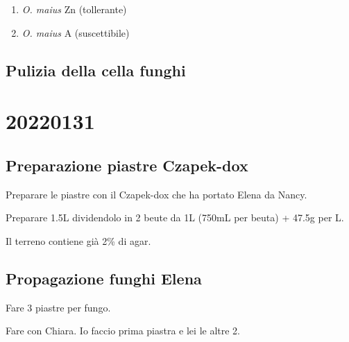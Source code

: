 \documentclass[
]{book}
\begin{document}
\begin{enumerate}
\def\labelenumi{\arabic{enumi}.}
\item
  \emph{O. maius} Zn (tollerante)
\item
  \emph{O. maius} A (suscettibile)
\end{enumerate}

\hypertarget{pulizia-della-cella-funghi}{%
\subsection{Pulizia della cella funghi}\label{pulizia-della-cella-funghi}}

\hypertarget{D20220131}{%
\section{20220131}\label{D20220131}}

\hypertarget{preparazione-piastre-czapek-dox}{%
\subsection{Preparazione piastre Czapek-dox}\label{preparazione-piastre-czapek-dox}}

Preparare le piastre con il Czapek-dox che ha portato Elena da Nancy.

Preparare 1.5L dividendolo in 2 beute da 1L (750mL per beuta) + 47.5g per L.

Il terreno contiene già 2\% di agar.

\hypertarget{propagazione-funghi-elena}{%
\subsection{Propagazione funghi Elena}\label{propagazione-funghi-elena}}

Fare 3 piastre per fungo.

Fare con Chiara. Io faccio prima piastra e lei le altre 2.
\end{document}
